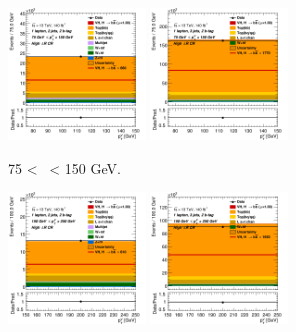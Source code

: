 \begin{figure}[h!]
    \centering
    \begin{subfigure}[b]{\textwidth}
        \centering
        \includegraphics[width=0.40\textwidth]{Images/VH/Own_fit/prefit_VHbb/Region_distpTV_BMax150_BMin75_DCRHigh_J2_TTypebb_T2_L1_Y6051_Prefit.png}
        \includegraphics[width=0.40\textwidth]{Images/VH/Own_fit/prefit_VHbb/Region_distpTV_BMax150_BMin75_DCRHigh_J3_TTypebb_T2_L1_Y6051_Prefit.png}
        \caption{75 < \ptv\ < 150 GeV.}
        \label{fig:plots_VHbb_1L_75_CRH}
    \end{subfigure}
    \begin{subfigure}[b]{\textwidth}
        \centering
        \includegraphics[width=0.40\textwidth]{Images/VH/Own_fit/prefit_VHbb/Region_distpTV_BMax250_BMin150_DCRHigh_J2_TTypebb_T2_L1_Y6051_Prefit.png}
        \includegraphics[width=0.40\textwidth]{Images/VH/Own_fit/prefit_VHbb/Region_distpTV_BMax250_BMin150_DCRHigh_J3_TTypebb_T2_L1_Y6051_Prefit.png}

\end{subfigure}
\end{figure}
